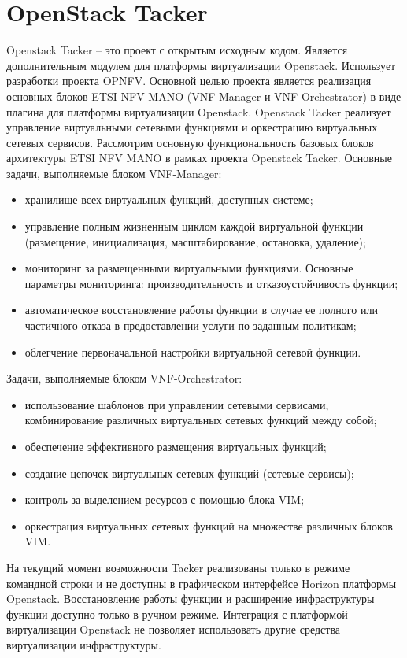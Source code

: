 \documentclass[oneside,final,14pt,a4paper]{extreport}
\begin{document}
\section{OpenStack Tacker}
Openstack Tacker -- это проект с открытым исходным кодом. Является дополнительным модулем для платформы виртуализации Openstack. Использует разработки проекта OPNFV. Основной целью проекта является реализация основных блоков ETSI NFV MANO (VNF-Manager и VNF-Orchestrator) в виде плагина для платформы виртуализации Openstack. Openstack Tacker реализует управление виртуальными сетевыми функциями и оркестрацию виртуальных сетевых сервисов.
	Рассмотрим основную функциональность базовых блоков архитектуры ETSI NFV MANO в рамках проекта Openstack Tacker. Основные задачи, выполняемые блоком VNF-Manager:
\begin{itemize}
	\item хранилище всех виртуальных функций, доступных системе;
	\item управление полным жизненным циклом каждой виртуальной функции (размещение, инициализация, масштабирование, остановка, удаление);
	\item мониторинг за размещенными виртуальными функциями. Основные параметры мониторинга: производительность и отказоустойчивость функции;
	\item автоматическое восстановление работы функции в случае ее полного или частичного отказа в предоставлении услуги по заданным политикам;
	\item облегчение первоначальной настройки виртуальной сетевой функции.
\end{itemize}

Задачи, выполняемые блоком VNF-Orchestrator:
\begin{itemize}
	\item использование шаблонов при управлении сетевыми сервисами, комбинирование различных виртуальных сетевых функций между собой;
	\item обеспечение эффективного размещения виртуальных функций;
	\item создание цепочек виртуальных сетевых функций (сетевые сервисы);
	\item контроль за выделением ресурсов с помощью блока VIM;
	\item оркестрация виртуальных сетевых функций на множестве различных блоков VIM.
\end{itemize}

На текущий момент возможности Tacker реализованы только в режиме командной строки и не доступны в графическом интерфейсе Horizon платформы Openstack.\cite{tacker-official} 
Восстановление работы функции и расширение инфраструктуры функции доступно только в ручном режиме. Интеграция с платформой виртуализации Openstack не позволяет использовать другие средства виртуализации инфраструктуры.
\end{document}
